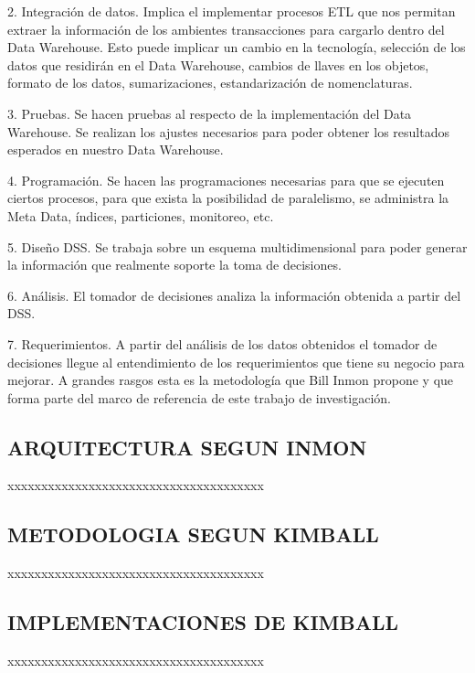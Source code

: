 \documentclass[%
 reprint,
 amsmath,amssymb,
 aps,
]{revtex4-1}
\begin{document}
2. Integración de datos. Implica el implementar procesos ETL que nos permitan extraer la información de los ambientes transacciones para cargarlo dentro del Data Warehouse. Esto puede implicar un cambio en la tecnología, selección de los datos que residirán en el Data Warehouse, cambios de llaves en los objetos, formato de los datos, sumarizaciones, estandarización de nomenclaturas.

3. Pruebas. Se hacen pruebas al respecto de la implementación del Data Warehouse. Se realizan los ajustes necesarios para poder obtener los resultados esperados en nuestro Data Warehouse.

4. Programación. Se hacen las programaciones necesarias para que se ejecuten ciertos procesos, para que exista la posibilidad de paralelismo, se administra la Meta Data, índices, particiones, monitoreo, etc.

5. Diseño DSS. Se trabaja sobre un esquema multidimensional para poder generar la información que realmente soporte la toma de decisiones.

6. Análisis. El tomador de decisiones analiza la información obtenida a partir del DSS.

7. Requerimientos. A partir del análisis de los datos obtenidos el tomador de decisiones llegue al entendimiento de los requerimientos que tiene su negocio para mejorar. A grandes rasgos esta es la metodología que Bill Inmon propone y que forma parte del marco de referencia de este trabajo de investigación.

\subsection{ARQUITECTURA SEGUN INMON}
xxxxxxxxxxxxxxxxxxxxxxxxxxxxxxxxxxxxxx 

\subsection{METODOLOGIA SEGUN KIMBALL}	
xxxxxxxxxxxxxxxxxxxxxxxxxxxxxxxxxxxxxx 

\subsection{IMPLEMENTACIONES DE KIMBALL}
xxxxxxxxxxxxxxxxxxxxxxxxxxxxxxxxxxxxxx 

\end{document}
